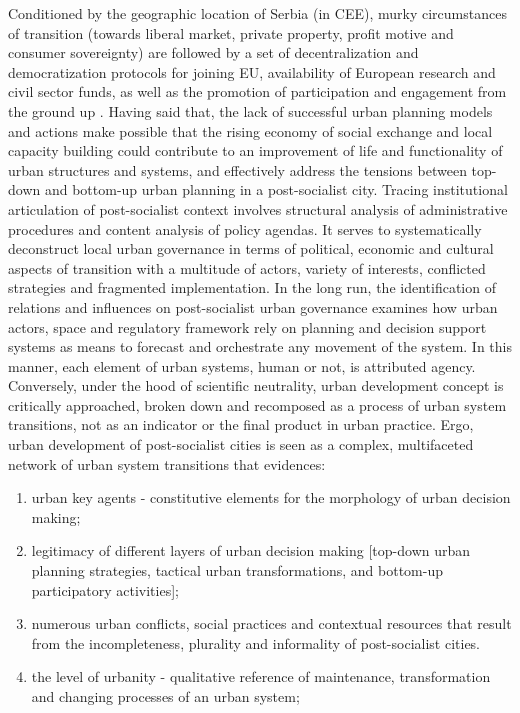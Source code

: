 \documentclass[11pt]{report}
\begin{document}
Conditioned by the geographic location of Serbia (in CEE), murky circumstances of transition (towards liberal market, private property, profit motive and consumer sovereignty) are followed by a set of decentralization and democratization protocols for joining EU, availability of European research and civil sector funds, as well as the promotion of participation and engagement from the ground up \href{ref}{\citealt{ref}}. Having said that, the lack of successful urban planning models and actions make possible that the rising economy of social exchange and local capacity building could contribute to an improvement of life and functionality of urban structures and systems, and effectively address the tensions between top-down and bottom-up urban planning in a post-socialist city. Tracing institutional articulation of post-socialist context involves structural analysis of administrative procedures and content analysis of policy agendas. It serves to systematically deconstruct local urban governance in terms of political, economic and cultural aspects of transition with a multitude of actors, variety of interests, conflicted strategies and fragmented implementation. In the long run, the identification of relations and influences on post-socialist urban governance examines how urban actors, space and regulatory framework rely on planning and decision support systems as means to forecast and orchestrate any movement of the system. In this manner, each element of urban systems, human or not, is attributed agency.
\\
Conversely, under the hood of scientific neutrality, urban development concept is critically approached, broken down and recomposed as a process of urban system transitions, not as an indicator or the final product in urban practice.
Ergo, urban development of post-socialist cities is seen as a complex, multifaceted network of urban system transitions that evidences: 
\begin{enumerate}
\item urban key agents - constitutive elements for the morphology of urban decision making;
\item legitimacy of different layers of urban decision making [top-down urban planning strategies, tactical urban transformations, and bottom-up participatory activities];
\item numerous urban conflicts, social practices and contextual resources that result from the incompleteness, plurality and informality of post-socialist cities.
\item the level of urbanity - qualitative reference of maintenance, transformation and changing processes of an urban system;
\end{enumerate}  
\end{document}
